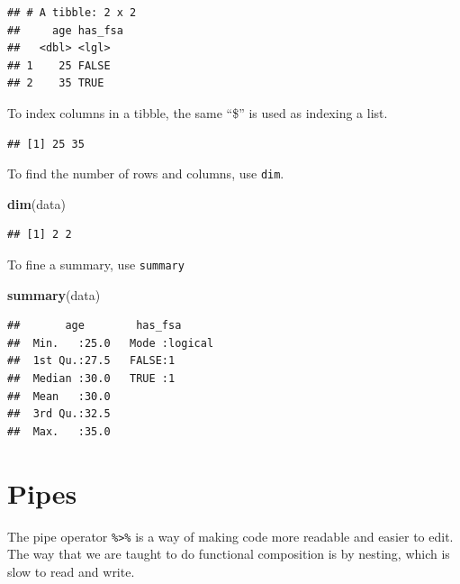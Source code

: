 \documentclass[]{book}
\newenvironment{Shaded}{\begin{snugshade}}{\end{snugshade}}
\newcommand{\KeywordTok}[1]{\textcolor[rgb]{0.13,0.29,0.53}{\textbf{#1}}}
\newcommand{\NormalTok}[1]{#1}
\newcommand{\OperatorTok}[1]{\textcolor[rgb]{0.81,0.36,0.00}{\textbf{#1}}}
\begin{document}
\begin{verbatim}
## # A tibble: 2 x 2
##     age has_fsa
##   <dbl> <lgl>  
## 1    25 FALSE  
## 2    35 TRUE
\end{verbatim}

To index columns in a tibble, the same ``\$'' is used as indexing a list.

\begin{Shaded}
\end{Shaded}

\begin{verbatim}
## [1] 25 35
\end{verbatim}

To find the number of rows and columns, use \texttt{dim}.

\begin{Shaded}
\begin{Highlighting}[]
\KeywordTok{dim}\NormalTok{(data)}
\end{Highlighting}
\end{Shaded}

\begin{verbatim}
## [1] 2 2
\end{verbatim}

To fine a summary, use \texttt{summary}

\begin{Shaded}
\begin{Highlighting}[]
\KeywordTok{summary}\NormalTok{(data)}
\end{Highlighting}
\end{Shaded}

\begin{verbatim}
##       age        has_fsa       
##  Min.   :25.0   Mode :logical  
##  1st Qu.:27.5   FALSE:1        
##  Median :30.0   TRUE :1        
##  Mean   :30.0                  
##  3rd Qu.:32.5                  
##  Max.   :35.0
\end{verbatim}

\hypertarget{pipes}{%
\section{Pipes}\label{pipes}}

The pipe operator \texttt{\%\textgreater{}\%} is a way of making code more readable and easier to edit. The way that we are taught to do functional composition is by nesting, which is slow to read and write.
\end{document}
